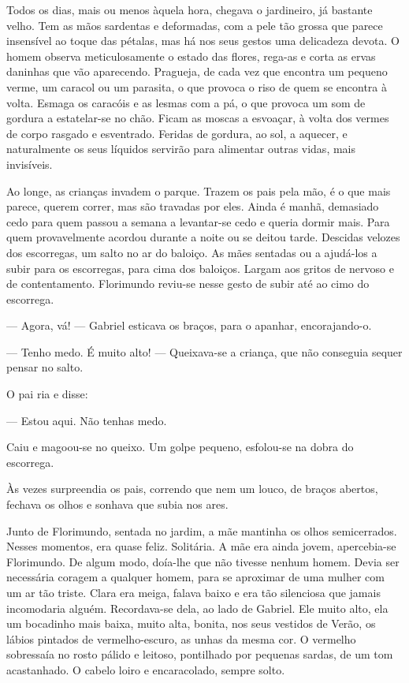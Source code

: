 Todos os dias, mais ou menos àquela hora, chegava o jardineiro, já
bastante velho. Tem as mãos sardentas e deformadas, com a pele tão
grossa que parece insensível ao toque das pétalas, mas há nos seus
gestos uma delicadeza devota. O homem observa meticulosamente o estado
das flores, rega-as e corta as ervas daninhas que vão aparecendo.
Pragueja, de cada vez que encontra um pequeno verme, um caracol ou um
parasita, o que provoca o riso de quem se encontra à volta. Esmaga os
caracóis e as lesmas com a pá, o que provoca um som de gordura a
estatelar-se no chão. Ficam as moscas a esvoaçar, à volta dos vermes de
corpo rasgado e esventrado. Feridas de gordura, ao sol, a aquecer, e
naturalmente os seus líquidos servirão para alimentar outras vidas, mais
invisíveis.

Ao longe, as crianças invadem o parque. Trazem os pais pela mão, é o que
mais parece, querem correr, mas são travadas por eles. Ainda é manhã,
demasiado cedo para quem passou a semana a levantar-se cedo e queria
dormir mais. Para quem provavelmente acordou durante a noite ou se
deitou tarde. Descidas velozes dos escorregas, um salto no ar do
baloiço. As mães sentadas ou a ajudá-los a subir para os escorregas,
para cima dos baloiços. Largam aos gritos de nervoso e de contentamento.
Florimundo reviu-se nesse gesto de subir até ao cimo do escorrega.

--- Agora, vá! --- Gabriel esticava os braços, para o apanhar,
encorajando-o.

--- Tenho medo. É muito alto! --- Queixava-se a criança, que não conseguia
sequer pensar no salto.

O pai ria e disse:

--- Estou aqui. Não tenhas medo.

Caiu e magoou-se no queixo. Um golpe pequeno, esfolou-se na dobra do
escorrega.

Às vezes surpreendia os pais, correndo que nem um louco, de braços
abertos, fechava os olhos e sonhava que subia nos ares.

Junto de Florimundo, sentada no jardim, a mãe mantinha os olhos
semicerrados. Nesses momentos, era quase feliz. Solitária. A mãe era
ainda jovem, apercebia-se Florimundo. De algum modo, doía-lhe que não
tivesse nenhum homem. Devia ser necessária coragem a qualquer homem,
para se aproximar de uma mulher com um ar tão triste. Clara era meiga,
falava baixo e era tão silenciosa que jamais incomodaria alguém.
Recordava-se dela, ao lado de Gabriel. Ele muito alto, ela um bocadinho
mais baixa, muito alta, bonita, nos seus vestidos de Verão, os lábios
pintados de vermelho-escuro, as unhas da mesma cor. O vermelho
sobressaía no rosto pálido e leitoso, pontilhado por pequenas sardas, de
um tom acastanhado. O cabelo loiro e encaracolado, sempre solto.

